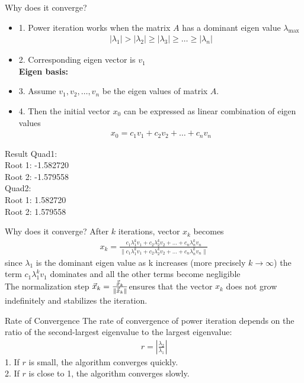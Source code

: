 \documentclass{beamer}
\theoremstyle{remark}
\providecommand{\abs}[1]{\left\vert#1\right\vert}
\providecommand{\norm}[1]{\lVert#1\rVert}
\numberwithin{equation}{section}
\begin{document}
\begin{frame}{Why does it converge?}
    \begin{itemize}
        \item 1. Power iteration works when the matrix $A$ has a dominant eigen value $\lambda_{\text{max}}$
        \begin{align}
            \abs{\lambda_1} > \abs{\lambda_2} \geq \abs{\lambda_3} \geq \dots \geq \abs{\lambda_n}
        \end{align}
        \item 2. Corresponding eigen vector is $v_1$\\
        \textbf{Eigen basis:}
        \item 3. Assume $v_1, v_2, \dots, v_n$ be the eigen values of matrix $A$.
        \item 4. Then the initial vector $x_0$ can be expressed as linear combination of eigen values
        \begin{align}
            x_0 = c_1v_1 + c_2v_2 + \dots + c_nv_n
        \end{align}
    \end{itemize}
\end{frame}

\begin{frame}{Result}
Quad1:\\
Root 1: -1.582720\\
Root 2: -1.579558\\

Quad2:\\
Root 1: 1.582720\\
Root 2: 1.579558
\end{frame}
\begin{frame}{Why does it converge?}
    After $k$ iterations, vector $x_k$ becomes
    \begin{align}
        x_k = \frac{c_1\lambda_1^kv_1 + c_2\lambda_2^kv_2 + \dots + c_n\lambda_n^kv_n}{\norm{c_1\lambda_1^kv_1 + c_2\lambda_2^kv_2 + \dots + c_n\lambda_n^kv_n}}
    \end{align}
    since $\lambda_1$ is the dominant eigen value as k increases (more precisely $k \to \infty$) the term $c_1\lambda_1^kv_1$ dominates and all the other terms become negligible\\
    The normalization step $\Vec{x}_k = \frac{\Vec{\Tilde{x}}_k}{\norm{\Vec{\Tilde{x}}_k}}$ensures that the vector $x_k$ does not grow indefinitely and stabilizes the iteration.
\end{frame}

\begin{frame}{Rate of Convergence}
    The rate of convergence of power iteration depends on the ratio of the second-largest eigenvalue to the largest eigenvalue:
    \begin{align}
        r = \abs{\frac{\lambda_2}{\lambda_1}}
    \end{align}
    1. If $r$ is small, the algorithm converges quickly.\\
    2. If $r$ is close to 1, the algorithm converges slowly.
\end{frame}
\end{document}
